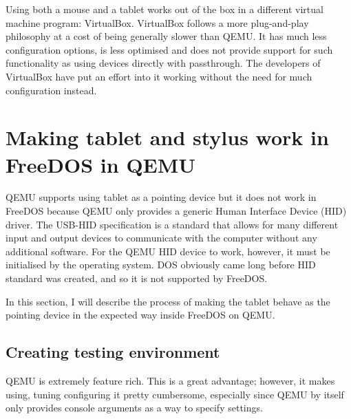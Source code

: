 
Using both a mouse and a tablet works out of the box in a different
virtual machine program: VirtualBox. VirtualBox follows a more plug-and-play
philosophy at a cost of being generally slower than QEMU. It has much less
configuration options, is less optimised and does not provide support for such
functionality as using devices directly with passthrough. The developers of
VirtualBox have put an effort into it working without the need for much
configuration instead.%




\clearpage %

\section{Making tablet and stylus work in FreeDOS in QEMU}


QEMU supports using tablet as a pointing device but it does not work in FreeDOS
because QEMU only provides a generic Human Interface Device (HID) driver.  The
USB-HID specification is a standard that allows for many different input and
output devices to communicate with the computer without any additional software.
For the QEMU HID device to work, however, it must be initialised by the operating
system.  DOS obviously came long before HID standard was created, and so it is
not supported by FreeDOS.

In this section, I will describe the process of making the tablet behave as the
pointing device in the expected way inside FreeDOS on QEMU.

\subsection{Creating testing environment}


QEMU is extremely feature rich.  This is a great advantage; however, it makes
using, tuning configuring it pretty cumbersome, especially since QEMU by itself
only provides console arguments as a way to specify settings.


